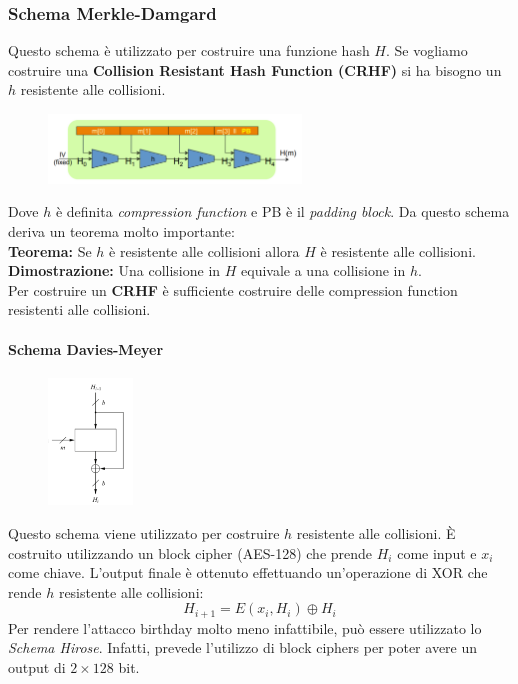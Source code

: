 \documentclass[a4paper,12pt]{article}
\begin{document}
\subsubsection{Schema Merkle-Damgard}
Questo schema è utilizzato per costruire una funzione hash $H$. 
Se vogliamo costruire una \textbf{Collision Resistant Hash Function (CRHF)} si ha bisogno un $h$ resistente alle collisioni.
\begin{figure}[H]
	\centering
	\includegraphics[width=0.6\textwidth]{img/merkle-damgard.png}
\end{figure}
Dove $h$ è definita \textit{compression function} e PB è il \textit{padding block}. 
Da questo schema deriva un teorema molto importante: \\
\textbf{Teorema:} Se $h$ è resistente alle collisioni allora $H$ è resistente alle collisioni. \\
\textbf{Dimostrazione:} Una collisione in $H$ equivale a una collisione in $h$. \\
Per costruire un \textbf{CRHF} è sufficiente costruire delle compression function resistenti alle collisioni.

\paragraph{Schema Davies-Meyer}
\begin{figure}[H]
  \centering
  \includegraphics[width=0.2\textwidth]{img/davies-meyer}
\end{figure}
Questo schema viene utilizzato per costruire $h$ resistente alle collisioni. È costruito utilizzando un block cipher (AES-128) che prende $H_i$ come input e $x_i$ come chiave.
L'output finale è ottenuto effettuando un'operazione di XOR che rende $h$ resistente alle collisioni:
$$ H_{i+1} = E(x_i, H_i) \oplus H_i $$ 
Per rendere l'attacco birthday molto meno infattibile, può essere utilizzato lo \textit{Schema Hirose}. Infatti, prevede l'utilizzo di block ciphers per poter avere un output di $2\times128$ bit.
\end{document}
